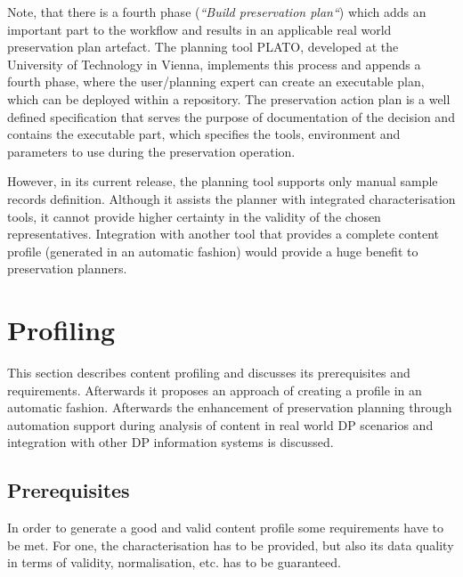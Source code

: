 Note, that there is a fourth phase (\textit{``Build preservation plan``}) which adds an important part to the workflow and results in an applicable real world preservation plan artefact. The planning tool PLATO, developed at the University of Technology in Vienna, implements this process and appends a fourth phase, where the user/planning expert can create an executable plan, which can be deployed within a repository. The preservation action plan is a well defined specification that serves the purpose of documentation of the decision and contains the executable part, which specifies the tools, environment and parameters to use during the preservation operation.

However, in its current release, the planning tool supports only manual sample records definition. Although it assists the planner with integrated characterisation tools, it cannot provide higher certainty in the validity of the chosen representatives. Integration with another tool that provides a complete content profile (generated in an automatic fashion) would provide a huge benefit to preservation planners.

\section{Profiling}
\label{sec:content_profiling}
This section describes content profiling and discusses its prerequisites and requirements. Afterwards it proposes an approach of creating a profile in an automatic fashion. Afterwards the enhancement of preservation planning through automation support during analysis of content in real world DP scenarios and integration with other DP information systems is discussed.

\subsection{Prerequisites}
In order to generate a good and valid content profile some requirements have to be met. For one, the characterisation has to be provided, but also its data quality in terms of validity, normalisation, etc. has to be guaranteed.

